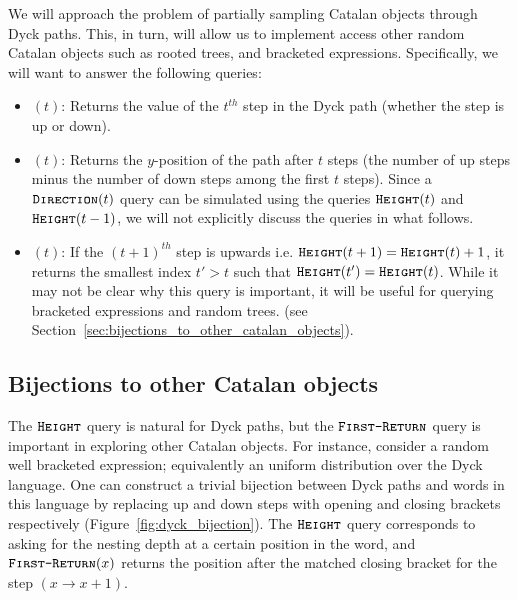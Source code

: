 We will approach the problem of partially sampling Catalan objects through Dyck paths.
This, in turn, will allow us to implement access other random Catalan objects such as rooted trees, and bracketed expressions.
Specifically, we will want to answer the following queries:
\begin{itemize}
    \item {}$(t)$: Returns the value of the $t^{th}$ step in the Dyck path (whether the step is up or down).
    \item {}$(t)$: Returns the $y$-position of the path after $t$ steps
    (the number of up steps minus the number of down steps among the first $t$ steps).
    Since a $\texttt{\textsc{Direction}}(t)$ query can be simulated using the queries $\texttt{\textsc{Height}}(t)$ and $\texttt{\textsc{Height}}(t-1)$,
    we will not explicitly discuss the  queries in what follows.
    \item {}$(t)$: If the $(t+1)^{th}$ step is upwards i.e. $\texttt{\textsc{Height}}(t+1) = \texttt{\textsc{Height}}(t)+1$,
    it returns the smallest index $t'>t$ such that $\texttt{\textsc{Height}}(t')=\texttt{\textsc{Height}}(t)$.
    While it may not be clear why this query is important, it will be useful for querying bracketed expressions and random trees.
    (see Section~\ref{sec:bijections_to_other_catalan_objects}).
\end{itemize}



\subsection{Bijections to other Catalan objects}%
The $\texttt{\textsc{Height}}$ query is natural for Dyck paths, but the $\texttt{\textsc{First-Return}}$ query is important in exploring other Catalan objects.
For instance, consider a random well bracketed expression; equivalently an uniform distribution over the Dyck language.
One can construct a trivial bijection between Dyck paths and words in this language
by replacing up and down steps with opening and closing brackets respectively (Figure~\ref{fig:dyck_bijection}).
The $\texttt{\textsc{Height}}$ query corresponds to asking for the nesting depth at a certain position in the word,
and $\texttt{\textsc{First-Return}}(x)$ returns the position after the matched closing bracket for the step $(x\rightarrow x+1)$.

